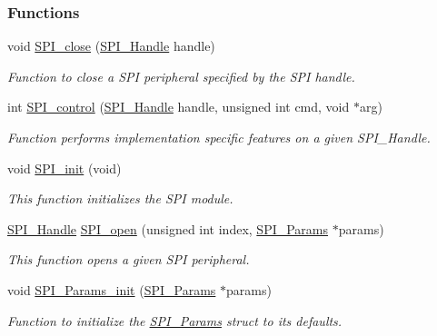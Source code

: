 \subsubsection*{Functions}
\begin{DoxyCompactItemize}
\item 
void \hyperlink{_s_p_i_8h_a0e3448b30b88609fa120915e49560601}{S\+P\+I\+\_\+close} (\hyperlink{_s_p_i_8h_a728806534c3c3e8675cfbfb7d8e36f13}{S\+P\+I\+\_\+\+Handle} handle)
\begin{DoxyCompactList}\small\item\em Function to close a S\+P\+I peripheral specified by the S\+P\+I handle. \end{DoxyCompactList}\item 
int \hyperlink{_s_p_i_8h_ab9d3a23991be2741f382749d3844cc2f}{S\+P\+I\+\_\+control} (\hyperlink{_s_p_i_8h_a728806534c3c3e8675cfbfb7d8e36f13}{S\+P\+I\+\_\+\+Handle} handle, unsigned int cmd, void $\ast$arg)
\begin{DoxyCompactList}\small\item\em Function performs implementation specific features on a given S\+P\+I\+\_\+\+Handle. \end{DoxyCompactList}\item 
void \hyperlink{_s_p_i_8h_afd9b09f58917f0e2d14c61b956eba214}{S\+P\+I\+\_\+init} (void)
\begin{DoxyCompactList}\small\item\em This function initializes the S\+P\+I module. \end{DoxyCompactList}\item 
\hyperlink{_s_p_i_8h_a728806534c3c3e8675cfbfb7d8e36f13}{S\+P\+I\+\_\+\+Handle} \hyperlink{_s_p_i_8h_a62cfe494cb1df47cd602e8747e894fd1}{S\+P\+I\+\_\+open} (unsigned int index, \hyperlink{struct_s_p_i___params}{S\+P\+I\+\_\+\+Params} $\ast$params)
\begin{DoxyCompactList}\small\item\em This function opens a given S\+P\+I peripheral. \end{DoxyCompactList}\item 
void \hyperlink{_s_p_i_8h_a9c3dd1748332fd6e31c79a6538a71642}{S\+P\+I\+\_\+\+Params\+\_\+init} (\hyperlink{struct_s_p_i___params}{S\+P\+I\+\_\+\+Params} $\ast$params)
\begin{DoxyCompactList}\small\item\em Function to initialize the \hyperlink{struct_s_p_i___params}{S\+P\+I\+\_\+\+Params} struct to its defaults. \end{DoxyCompactList}\item 

\end{DoxyCompactItemize}
